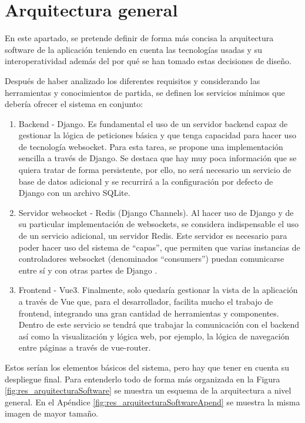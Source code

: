 \section{Arquitectura general}

En este apartado, se pretende definir de forma más concisa la arquitectura software de la aplicación
teniendo en cuenta las tecnologías usadas y su interoperatividad además del por qué se han tomado estas decisiones de diseño.

Después de haber analizado los diferentes requisitos y considerando las herramientas y conocimientos de partida,
se definen los servicios mínimos que debería ofrecer el sistema en conjunto:

\begin{enumerate}
	\item Backend - Django. Es fundamental el uso de un servidor backend capaz de
	      gestionar la lógica de peticiones básica y que tenga capacidad para hacer uso de tecnología websocket.
	      Para esta tarea, se propone una implementación sencilla a través de Django. Se destaca que hay muy poca información que se
	      quiera tratar de forma persistente, por ello, no será necesario un servicio de base de datos adicional
	      y se recurrirá a la configuración por defecto de Django con un archivo SQLite.
	\item Servidor websocket - Redis (Django Channels). Al hacer uso de Django y de su particular implementación de
	      websockets, se considera indispensable el uso de un servicio adicional, un servidor Redis. Este servidor es necesario para
	      poder hacer uso del sistema de ``capas'', que permiten que varias instancias de controladores websocket
	      (denominados ``consumers'') puedan comunicarse entre sí y con otras partes de Django \cite{djangoChannelsLayers}.
	\item Frontend - Vue3. Finalmente, solo quedaría gestionar la vista de la aplicación a través de Vue
	      que, para el desarrollador, facilita mucho el trabajo de frontend, integrando una gran cantidad de herramientas y componentes.
	      Dentro de este servicio se tendrá que trabajar la comunicación con el backend así como la visualización y lógica
	      web, por ejemplo, la lógica de navegación entre páginas a través de vue-router.
\end{enumerate}

Estos serían los elementos básicos del sistema, pero hay que tener en cuenta su
despliegue final. Para entenderlo todo de forma más organizada en la Figura \ref{fig:res_arquitecturaSoftware} se muestra un esquema de la arquitectura
a nivel general. En el Apéndice \ref{fig:res_arquitecturaSoftwareApend} se muestra la misma imagen de mayor tamaño.

